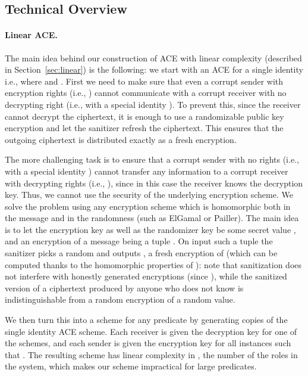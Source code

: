 \documentclass{llncs}
\begin{document}
\subsection{Technical Overview} 

\paragraph{Linear ACE.} The main idea behind our construction of ACE with linear complexity (described in Section~\ref{sec:linear}) 
is the following: we start with an ACE for a single identity i.e., where  and . First we need 
to make sure that even a corrupt sender with encryption rights (i.e., ) cannot communicate with a 
corrupt receiver with no decrypting right (i.e., with a special identity ). To prevent this, since the receiver cannot 
decrypt the ciphertext, it is enough to use a randomizable public key encryption and let the sanitizer 
refresh the ciphertext. This ensures that the outgoing ciphertext is distributed exactly as a fresh 
encryption.

The more challenging task is to ensure that a corrupt sender with no rights (i.e., with a special identity ) cannot transfer any information to a corrupt receiver with decrypting rights (i.e., ), since in this case the receiver knows the decryption key. Thus, we cannot use the security of the underlying encryption scheme. We solve the problem using any encryption scheme which is homomorphic both in the message and in the randomness (such as ElGamal or Pailler). The main idea is to let the encryption key  as well as the randomizer key  be some secret value , and an encryption of a message  being a tuple . On input such a tuple the sanitizer picks a random  and outputs , a fresh encryption of  (which can be computed thanks to the homomorphic properties of ): note that sanitization does not interfere with honestly generated encryptions (since ), while the sanitized version of a ciphertext produced by anyone who does not know  is indistinguishable from a random encryption of a random value. 

We then turn this into a scheme for any predicate  by generating  copies of the single identity ACE scheme. Each receiver  is given the decryption key for one of the schemes, and each sender  is given the encryption key for all instances  such that . The resulting scheme has linear complexity in , the number of the roles in the system, which makes our scheme impractical for large predicates.
\end{document}
